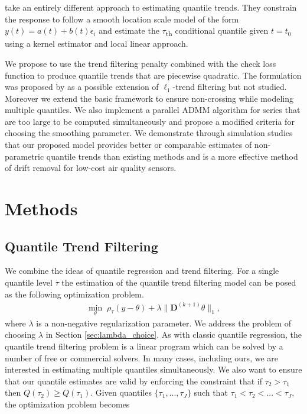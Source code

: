 \documentclass[12pt]{article}
\begin{document}
	\cite{Racine2017} take an entirely different approach to estimating quantile trends. They constrain the response to follow a smooth location scale model of the form $y(t) = a(t) + b(t)\epsilon_i$ and estimate the $\tau$\textsubscript{th} conditional quantile given $t = t_0$ using a kernel estimator and local linear approach. 

	We propose to use the trend filtering penalty combined with the check loss function to produce quantile trends that are piecewise quadratic. The formulation was proposed by \cite{Kim2009} as a possible extension of $\ell_1$-trend filtering but not studied. Moreover we extend the basic framework to ensure non-crossing while modeling multiple quantiles. We also implement a parallel ADMM algorithm for series that are too large to be computed simultaneously and propose a modified criteria for choosing the smoothing parameter. We demonstrate through simulation studies that our proposed model provides better or comparable estimates of non-parametric quantile trends than existing methods and is a more effective method of drift removal for low-cost air quality sensors. 
	

	\section{Methods}
	
	\subsection{Quantile Trend Filtering}
	
	We combine the ideas of quantile regression and trend filtering. For a single quantile level $\tau$ the estimation of the quantile trend filtering model can be posed as the following optimization problem.
	\begin{eqnarray}
	\label{eq:quantile_trend}
	\underset{\theta}{\min}\; \rho_\tau(y - \theta) + \lambda \lVert \mathbf{D}^{(k+1)} \theta \rVert_1,
	\end{eqnarray}
	where $\lambda$ is a non-negative regularization parameter. We address the problem of choosing $\lambda$ in Section \ref{sec:lambda_choice}. As with classic quantile regression, the quantile trend filtering problem is a linear program which can be solved by a number of free or commercial solvers. In many cases, including ours, we are interested in estimating multiple quantiles simultaneously. We also want to ensure that our quantile estimates are valid by enforcing the constraint that if $\tau_2 > \tau_1$ then $Q(\tau_2) \ge Q(\tau_1)$. Given quantiles $\{\tau_1, ..., \tau_J\}$ such that $\tau_1 < \tau_2 < ... < \tau_J$, the optimization problem becomes 
	
\end{document}
